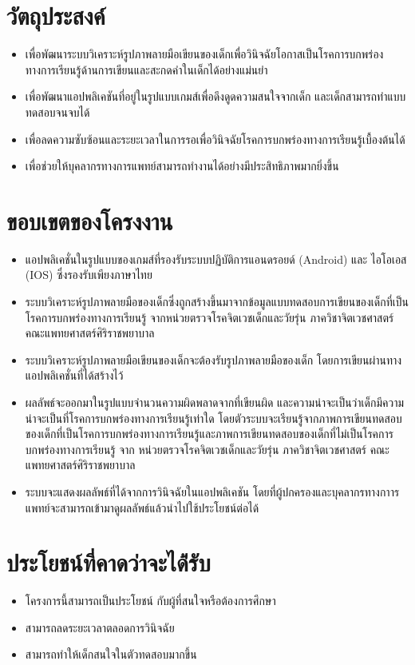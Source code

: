 \documentclass[12pt,oneside,openright,a4paper]{cpe-thai-project}
\begin{document}
\section{วัตถุประสงค์}

\begin{itemize}
  \item  เพื่อพัฒนาระบบวิเคราะห์รูปภาพลายมือเขียนของเด็กเพื่อวินิจฉัยโอกาสเป็นโรคการบกพร่องทางการเรียนรู้ด้านการเขียนและสะกดคำในเด็กได้อย่างแม่นยำ
  \item  เพื่อพัฒนาแอปพลิเคชันที่อยู่ในรูปแบบเกมส์เพื่อดึงดูดความสนใจจากเด็ก และเด็กสามารถทำแบบทดสอบจนจบได้ 
  \item  เพื่อลดความซับซ้อนและระยะเวลาในการรอเพื่อวินิจฉัยโรคการบกพร่องทางการเรียนรู้เบื้องต้นได้
  \item  เพื่อช่วยให้บุคลากรทางการแพทย์สามารถทำงานได้อย่างมีประสิทธิภาพมากยิ่งขึ้น  
  \end{itemize}

\section{ขอบเขตของโครงงาน}

\begin{itemize}
\item  แอปพลิเคชั่นในรูปแบบของเกมส์ที่รองรับระบบปฏิบัติการแอนดรอยด์ (Android)  และ ไอโอเอส (IOS) ซึ่งรองรับเพียงภาษาไทย 
\item  ระบบวิเคราะห์รูปภาพลายมือของเด็กซึ่งถูกสร้างขึ้นมาจากข้อมูลแบบทดสอบการเขียนของเด็กที่เป็นโรคการบกพร่องทางการเรียนรู้ จากหน่วยตรวจโรคจิตเวชเด็กและวัยรุ่น ภาควิชาจิตเวชศาสตร์ คณะแพทยศาสตร์ศิริราชพยาบาล
\item  ระบบวิเคราะห์รูปภาพลายมือเขียนของเด็กจะต้องรับรูปภาพลายมือของเด็ก โดยการเขียนผ่านทางแอปพลิเคชั่นที่ได้สร้างไว้
\item  ผลลัพธ์จะออกมาในรูปแบบจำนวนความผิดพลาดจากที่เขียนผิด และความน่าจะเป็นว่าเด็กมีความน่าจะเป็นที่โรคการบกพร่องทางการเรียนรู้เท่าใด โดยตัวระบบจะเรียนรู้จากภาพการเขียนทดสอบของเด็กที่เป็นโรคการบกพร่องทางการเรียนรู้และภาพการเขียนทดสอบของเด็กที่ไม่เป็นโรคการบกพร่องทางการเรียนรู้ จาก หน่วยตรวจโรคจิตเวชเด็กและวัยรุ่น ภาควิชาจิตเวชศาสตร์ คณะแพทยศาสตร์ศิริราชพยาบาล
\item  ระบบจะแสดงผลลัพธ์ที่ได้จากการวินิจฉัยในแอปพลิเคชัน โดยที่ผู้ปกครองและบุคลากรทางกาารแพทย์จะสามารถเข้ามาดูผลลัพธ์แล้วนำไปใช้ประโยชน์ต่อได้ 
\end{itemize}

\section{ประโยชน์ที่คาดว่าจะได้่รับ}
\begin{itemize}
  \item โครงการนี้สามารถเป็นประโยชน์ กับผู้ที่สนใจหรือต้องการศึกษา
  \item สามารถลดระยะเวลาตลอดการวินิจฉัย
  \item สามารถทำให้เด็กสนใจในตัวทดสอบมากขึ้น
\end{itemize}
\end{document}
